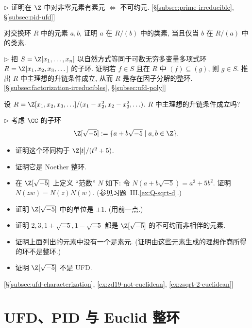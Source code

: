 \begin{prob}
\label{ex:prime-irred-Z}
$\triangleright$ 证明在 $\Z$ 中对非零元素有素元 $\Leftrightarrow$ 不可约元. [§\ref{subsec:prime-irreducible}, §\ref{subsec:pid-ufd}]
\end{prob}

\begin{prob}
\label{ex:class-prime}
对交换环 $R$ 中的元素 $a,b$, 证明 $a$ 在 $R/(b)$ 中的类素, 当且仅当 $b$ 在 $R/(a)$ 中的类素.
\end{prob}

\begin{prob}
\label{ex:zinfinite-acc}
$\triangleright$ 把 $S = \Z[x_1,\dots,x_n]$ 以自然方式等同于可数无穷多变量多项式环 $R = \Z[x_1,x_2,x_3,\dots]$ 的子环. 证明若 $f\in S$ 且在 $R$ 中 $(f)\subseteq (g)$, 则 $g\in S$. 推出 $R$ 中主理想的升链条件成立, 从而 $R$ 是存在因子分解的整环. [§\ref{subsec:factorization-irreducibles}, §\ref{subsec:ufd-poly}]
\end{prob}

\begin{prob}
\label{ex:acc-infinite}
设 $R=\Z[x_1,x_2,x_3,\ldots]/(x_1-x_2^2,x_2-x_3^2,\ldots)$. $R$ 中主理想的升链条件成立吗?
\end{prob}

\begin{prob}
\label{ex:zsqrt5}
$\triangleright$ 考虑 $\CC$ 的子环
\[
\Z[\sqrt{-5}] := \{a + b\sqrt{-5} \mid a,b\in\Z\}.
\]
\begin{itemize}
\item 证明这个环同构于 $\Z[t]/(t^2 + 5)$.
\item 证明它是 Noether 整环.
\item 在 $\Z[\sqrt{-5}]$ 上定义 ``范数'' $N$ 如下: 令 $N(a + b\sqrt{-5}) = a^2 + 5b^2$. 证明 $N(zw) = N(z)N(w)$. (参见习题~III.\ref{ex:Q-sqrt-d}.)
\item 证明 $\Z[\sqrt{-5}]$ 中的单位是 $\pm 1$. (用前一点.)
\item 证明 $2, 3, 1 + \sqrt{-5}, 1 - \sqrt{-5}$ 都是 $\Z[\sqrt{-5}]$ 的不可约而非相伴的元素.
\item 证明上面列出的元素中没有一个是素元. (证明由这些元素生成的理想作商所得的环不是整环.)
\item 证明 $\Z[\sqrt{-5}]$ 不是 UFD.
\end{itemize}
[§\ref{subsec:ufd-characterization}, \ref{ex:zd19-not-euclidean}, \ref{ex:zsqrt-2-euclidean}]
\end{prob}
\section{UFD、PID 与 Euclid 整环}
\label{sec:ufds-pids-euclidean}

